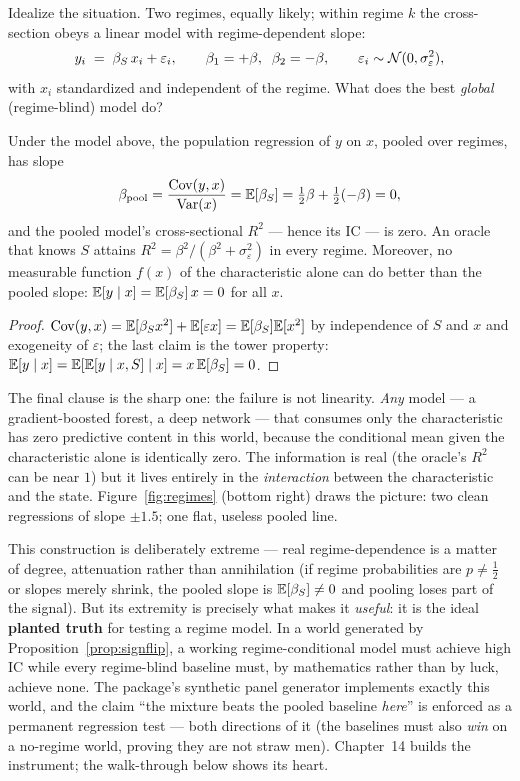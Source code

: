 Idealize the situation. Two regimes, equally likely; within regime $k$ the
cross-section obeys a linear model with regime-dependent slope:
\[
  y_i \;=\; \beta_{S}\, x_i + \varepsilon_i,
  \qquad
  \beta_1 = +\beta,\;\; \beta_2 = -\beta,
  \qquad
  \varepsilon_i \sim \mathcal{N}(0, \sigma_\varepsilon^2),
\]
with $x_i$ standardized and independent of the regime. What does the best
\emph{global} (regime-blind) model do?

\begin{proposition}
\label{prop:signflip}
Under the model above, the population regression of $y$ on $x$, pooled over
regimes, has slope
\[
  \beta_{\mathrm{pool}}
  = \frac{\operatorname{Cov}(y, x)}{\operatorname{Var}(x)}
  = \mathbb{E}[\beta_S]
  = \tfrac12 \beta + \tfrac12 (-\beta) = 0 ,
\]
and the pooled model's cross-sectional $R^2$ --- hence its IC --- is zero.
An oracle that knows $S$ attains
$R^2 = \beta^2 / (\beta^2 + \sigma_\varepsilon^2)$ in every regime.
Moreover, no measurable function $f(x)$ of the characteristic alone can do
better than the pooled slope: $\mathbb{E}[y \mid x] = \mathbb{E}[\beta_S]\,x = 0$ for all
$x$.
\end{proposition}

\begin{proof}
$\operatorname{Cov}(y, x) = \mathbb{E}[\beta_S x^2] + \mathbb{E}[\varepsilon x] = \mathbb{E}[\beta_S]\mathbb{E}[x^2]$
by independence of $S$ and $x$ and exogeneity of $\varepsilon$; the last
claim is the tower property: $\mathbb{E}[y \mid x] = \mathbb{E}[\mathbb{E}[y \mid x, S] \mid x] =
x\,\mathbb{E}[\beta_S] = 0$.
\end{proof}

The final clause is the sharp one: the failure is not linearity. \emph{Any}
model --- a gradient-boosted forest, a deep network --- that consumes only
the characteristic has zero predictive content in this world, because the
conditional mean given the characteristic alone is identically zero. The
information is real (the oracle's $R^2$ can be near $1$) but it lives
entirely in the \emph{interaction} between the characteristic and the state.
Figure~\ref{fig:regimes} (bottom right) draws the picture: two clean
regressions of slope $\pm 1.5$; one flat, useless pooled line.

This construction is deliberately extreme --- real regime-dependence is a
matter of degree, attenuation rather than annihilation (if regime
probabilities are $p \ne \tfrac12$ or slopes merely shrink, the pooled slope
is $\mathbb{E}[\beta_S] \ne 0$ and pooling loses part of the signal). But its
extremity is precisely what makes it \emph{useful}: it is the ideal
\textbf{planted truth} for testing a regime model. In a world generated by
Proposition~\ref{prop:signflip}, a working regime-conditional model must
achieve high IC while every regime-blind baseline must, by mathematics
rather than by luck, achieve none. The package's synthetic panel generator
implements exactly this world, and the claim ``the mixture beats the pooled
baseline \emph{here}'' is enforced as a permanent regression test --- both
directions of it (the baselines must also \emph{win} on a no-regime world,
proving they are not straw men). Chapter~14 builds the instrument; the walk-through
below shows its heart.

